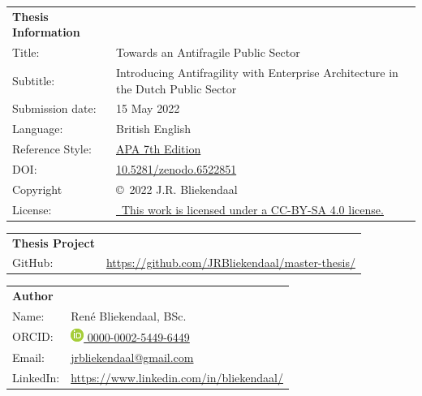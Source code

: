 \thispagestyle{plain}
	\begin{tabular}{p{}p{}}
		\textbf{Thesis Information} & \\
		Title: & Towards an Antifragile Public Sector \\
		Subtitle: & Introducing Antifragility with Enterprise Architecture in the Dutch Public Sector \\
		Submission date: & 15 May 2022 \\
		Language: & British English \\
		Reference Style: & \href{https://apastyle.apa.org/products/publication-manual-7th-edition}{APA 7th Edition}\\
		DOI: & \href{https://www.doi.org/10.5281/zenodo.6522851/}{10.5281/zenodo.6522851} \\
		Copyright & \copyright\ 2022 J.R. Bliekendaal\\
		License: & \href{https://creativecommons.org/licenses/by-sa/4.0/}{\ccbysa\ This work is licensed under a CC-BY-SA 4.0 license.}\\
	\end{tabular}

\vspace{\baselineskip}

	\begin{tabular}{p{}p{}}
		\textbf{Thesis Project} & \\
		GitHub: & \url{https://github.com/JRBliekendaal/master-thesis/}\\
	\end{tabular}

\vspace{\baselineskip}

	\begin{tabular}{p{}p{}}
		\textbf{Author} & \\
		Name: & René Bliekendaal, BSc. \\
		ORCID: & \href{https://orcid.org/0000-0002-5449-6449/}{\includegraphics[scale=0.45]{images/ORCIDiD_icon} 0000-0002-5449-6449}\\
		Email: & \href{mailto:jrbliekendaal@gmail.com}{jrbliekendaal@gmail.com}\\
		LinkedIn: & \url{https://www.linkedin.com/in/bliekendaal/}\\
	\end{tabular}

